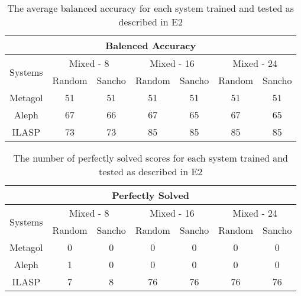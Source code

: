 \begin{table}[]
	\begin{tabular}{|c|c|c|c|c|c|c|}
		\hline
		\multicolumn{7}{|c|}{Balenced Accuracy}                                                                                       \\ \hline
		\multirow{2}{*}{Systems} & \multicolumn{2}{c|}{Mixed - 8} & \multicolumn{2}{c|}{Mixed - 16} & \multicolumn{2}{c|}{Mixed - 24} \\ \cline{2-7}
		& Random         & Sancho        & Random         & Sancho         & Random         & Sancho         \\ \hline
		Metagol                  & 51             & 51            & 51             & 51             & 51             & 51             \\ \hline
		Aleph                    & 67             & 66            & 67             & 65             & 67             & 65             \\ \hline
		ILASP                    & 73             & 73            & 85             & 85             & 85             & 85             \\ \hline
	\end{tabular}
	\label{E2-BA}
	\caption{The average balanced accuracy for each system trained and tested as described in E2}
\end{table}

\begin{table}[]
	\begin{tabular}{|c|c|c|c|c|c|c|}
		\hline
		\multicolumn{7}{|c|}{Perfectly Solved}                                                                                        \\ \hline
		\multirow{2}{*}{Systems} & \multicolumn{2}{c|}{Mixed - 8} & \multicolumn{2}{c|}{Mixed - 16} & \multicolumn{2}{c|}{Mixed - 24} \\ \cline{2-7}
		& Random         & Sancho        & Random         & Sancho         & Random         & Sancho         \\ \hline
		Metagol                  & 0              & 0             & 0              & 0              & 0              & 0              \\ \hline
		Aleph                    & 1              & 0             & 0              & 0              & 0              & 0              \\ \hline
		ILASP                    & 7              & 8             & 76             & 76             & 76             & 76             \\ \hline
	\end{tabular}
	\label{E2-P}
	\caption{The number of perfectly solved scores for each system trained and tested as described in E2}
\end{table}

